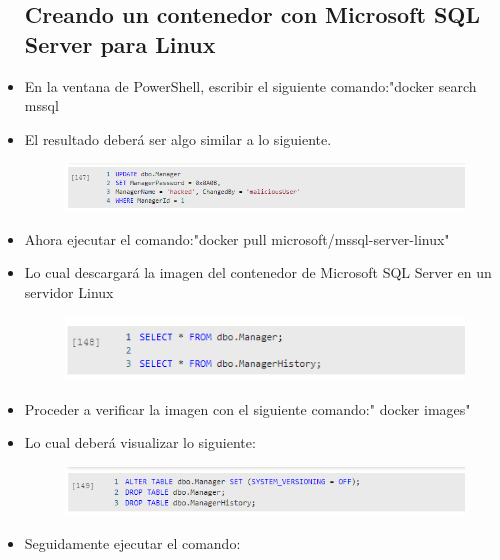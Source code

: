 \begin{itemize}
\subsection{Creando un contenedor con Microsoft SQL Server para Linux}
	\item En la ventana de PowerShell, escribir el siguiente comando:"docker search mssql      
	\item El resultado deberá ser algo similar a lo siguiente.
                     \begin{figure}[H]
		\begin{center}
		\includegraphics[width=15cm]{./Imagenes/s8}
		\end{center}
		\end{figure}   
	\item Ahora ejecutar el comando:"docker pull microsoft/mssql-server-linux"
	\item Lo cual descargará la imagen del contenedor de Microsoft SQL Server en un servidor Linux
                     \begin{figure}[H]
		\begin{center}
		\includegraphics[width=15cm]{./Imagenes/s9}
		\end{center}
		\end{figure}   
          \item Proceder a verificar la imagen con el siguiente comando:" docker images"
	\item Lo cual deberá visualizar lo siguiente:
                     \begin{figure}[H]
		\begin{center}
		\includegraphics[width=15cm]{./Imagenes/s10}
		\end{center}
		\end{figure}   
	\item Seguidamente ejecutar el comando:
                      \begin{figure}[H]

\end{figure}
\end{itemize}

